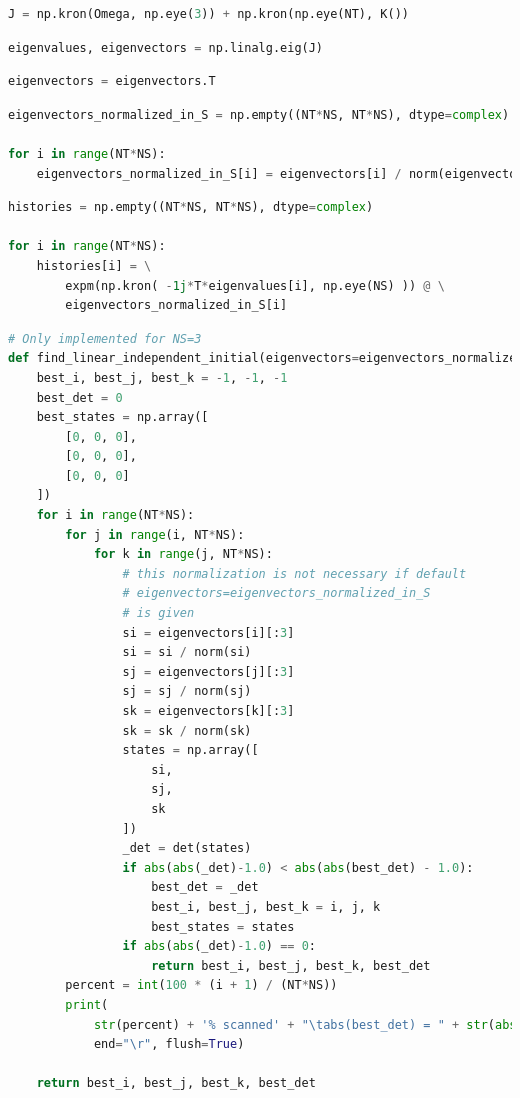 \begin{lstlisting}[language=Python]
J = np.kron(Omega, np.eye(3)) + np.kron(np.eye(NT), K())
\end{lstlisting}

\begin{lstlisting}[language=Python]
eigenvalues, eigenvectors = np.linalg.eig(J)
\end{lstlisting}

\begin{lstlisting}[language=Python]
eigenvectors = eigenvectors.T
\end{lstlisting}

\begin{lstlisting}[language=Python]
eigenvectors_normalized_in_S = np.empty((NT*NS, NT*NS), dtype=complex)

for i in range(NT*NS):
    eigenvectors_normalized_in_S[i] = eigenvectors[i] / norm(eigenvectors[i][:3])
\end{lstlisting}

\begin{lstlisting}[language=Python]
histories = np.empty((NT*NS, NT*NS), dtype=complex)

for i in range(NT*NS):
    histories[i] = \
        expm(np.kron( -1j*T*eigenvalues[i], np.eye(NS) )) @ \
        eigenvectors_normalized_in_S[i]
\end{lstlisting}

\begin{lstlisting}[language=Python]
# Only implemented for NS=3
def find_linear_independent_initial(eigenvectors=eigenvectors_normalized_in_S):
    best_i, best_j, best_k = -1, -1, -1
    best_det = 0
    best_states = np.array([
        [0, 0, 0],
        [0, 0, 0],
        [0, 0, 0]
    ])
    for i in range(NT*NS):
        for j in range(i, NT*NS):
            for k in range(j, NT*NS):
                # this normalization is not necessary if default
                # eigenvectors=eigenvectors_normalized_in_S
                # is given
                si = eigenvectors[i][:3]
                si = si / norm(si)
                sj = eigenvectors[j][:3]
                sj = sj / norm(sj)
                sk = eigenvectors[k][:3]
                sk = sk / norm(sk)
                states = np.array([
                    si,
                    sj,
                    sk
                ])
                _det = det(states)
                if abs(abs(_det)-1.0) < abs(abs(best_det) - 1.0):
                    best_det = _det
                    best_i, best_j, best_k = i, j, k
                    best_states = states
                if abs(abs(_det)-1.0) == 0:
                    return best_i, best_j, best_k, best_det
        percent = int(100 * (i + 1) / (NT*NS))
        print(
            str(percent) + '% scanned' + "\tabs(best_det) = " + str(abs(best_det)),
            end="\r", flush=True)
        
    return best_i, best_j, best_k, best_det

\end{lstlisting}

